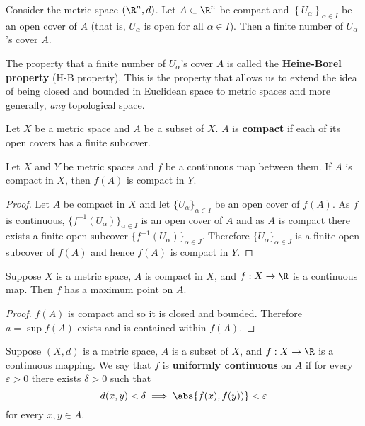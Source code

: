 \begin{theorem}
	Consider the metric space $(\R^n, d)$.
	Let $A \subset \R^n$ be compact and
	$\left\{ U_\alpha \right\}_{\alpha \in I}$ be an open cover of $A$
	(that is, $U_\alpha$ is open for all $\alpha \in I$).
	Then a finite number of $U_\alpha$'s cover $A$.
\end{theorem}

\begin{remark}
	The property that a finite number of $U_\alpha$'s cover $A$ is called the
	\textbf{Heine-Borel property} (H-B property).
	This is the property that allows us to extend the idea of being closed
	and bounded in Euclidean space to metric spaces and more generally,
	\emph{any} topological space.
\end{remark}

\begin{definition}[Compact]
	Let $X$ be a metric space and $A$ be a subset of $X$.
	$A$ is \textbf{compact} if each of its open covers has a finite subcover.
\end{definition}

\begin{theorem}[]
	Let $X$ and $Y$ be metric spaces and $f$ be a continuous map between them.
	If $A$ is compact in $X$, then $f(A)$ is compact in $Y$.
\end{theorem}

\begin{proof}
	Let $A$ be compact in $X$ 
	and let $\{U_\alpha\}_{\alpha \in I}$ be an open cover of $f(A)$. 
	As $f$ is continuous,
	$\{f^{-1}(U_\alpha)\}_{\alpha \in I}$ is an open cover of $A$
	and as $A$ is compact there exists a finite open subcover
	$\{f^{-1}(U_\alpha)\}_{\alpha \in J}$.
	Therefore $\{U_\alpha\}_{\alpha \in J}$ is a finite open subcover of $f(A)$
	and hence $f(A)$ is compact in $Y$.
\end{proof}

\begin{theorem}[]
	Suppose $X$ is a metric space, 
	$A$ is compact in $X$, 
	and $f: X \to \R$ is a continuous map.
	Then $f$ has a maximum point on $A$.
\end{theorem}

\begin{proof}
	$f(A)$ is compact and so it is closed and bounded.
	Therefore $a = \sup{f(A)}$ exists and is contained within $f(A)$.
\end{proof}

\begin{definition}
	Suppose $(X, d)$ is a metric space,
	$A$ is a subset of $X$,
	and $f: X \to \R$ is a continuous mapping.
	We say that $f$ is \textbf{uniformly continuous} on $A$
	if for every $\varepsilon > 0$ there exists $\delta > 0$
	such that \[
		d(x, y) < \delta \implies \abs{f(x), f(y))} < \varepsilon
	\]
	for every $x, y \in A$.
\end{definition}

